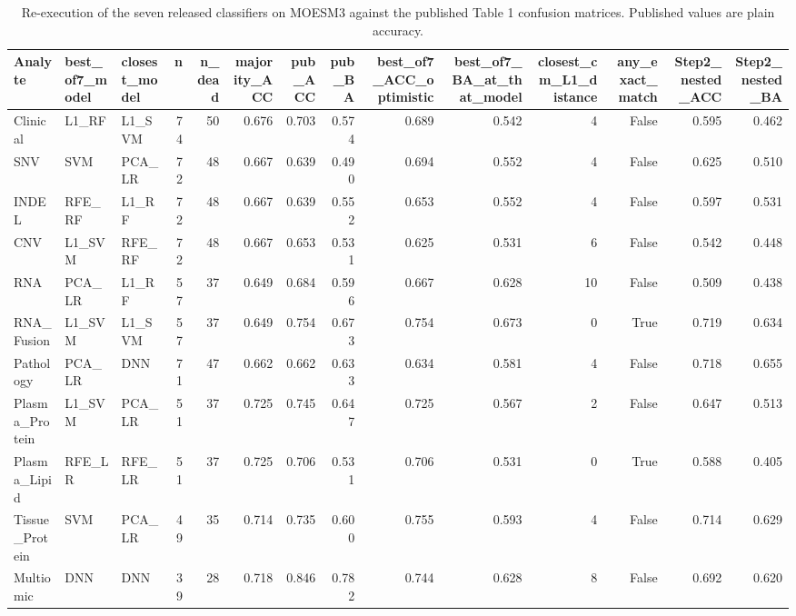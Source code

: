 \begin{table}[t]
\centering
\caption{Re-execution of the seven released classifiers on MOESM3 against the published Table 1 confusion matrices. Published values are plain accuracy.}
\begin{tabular}{lllrrrrrrrrrrr}
\hline
Analyte & best\_of7\_model & closest\_model & n & n\_dead & majority\_ACC & pub\_ACC & pub\_BA & best\_of7\_ACC\_optimistic & best\_of7\_BA\_at\_that\_model & closest\_cm\_L1\_distance & any\_exact\_match & Step2\_nested\_ACC & Step2\_nested\_BA \\
\hline
Clinical & L1\_RF & L1\_SVM & 74 & 50 & 0.676 & 0.703 & 0.574 & 0.689 & 0.542 & 4 & False & 0.595 & 0.462 \\
SNV & SVM & PCA\_LR & 72 & 48 & 0.667 & 0.639 & 0.490 & 0.694 & 0.552 & 4 & False & 0.625 & 0.510 \\
INDEL & RFE\_RF & L1\_RF & 72 & 48 & 0.667 & 0.639 & 0.552 & 0.653 & 0.552 & 4 & False & 0.597 & 0.531 \\
CNV & L1\_SVM & RFE\_RF & 72 & 48 & 0.667 & 0.653 & 0.531 & 0.625 & 0.531 & 6 & False & 0.542 & 0.448 \\
RNA & PCA\_LR & L1\_RF & 57 & 37 & 0.649 & 0.684 & 0.596 & 0.667 & 0.628 & 10 & False & 0.509 & 0.438 \\
RNA\_Fusion & L1\_SVM & L1\_SVM & 57 & 37 & 0.649 & 0.754 & 0.673 & 0.754 & 0.673 & 0 & True & 0.719 & 0.634 \\
Pathology & PCA\_LR & DNN & 71 & 47 & 0.662 & 0.662 & 0.633 & 0.634 & 0.581 & 4 & False & 0.718 & 0.655 \\
Plasma\_Protein & L1\_SVM & PCA\_LR & 51 & 37 & 0.725 & 0.745 & 0.647 & 0.725 & 0.567 & 2 & False & 0.647 & 0.513 \\
Plasma\_Lipid & RFE\_LR & RFE\_LR & 51 & 37 & 0.725 & 0.706 & 0.531 & 0.706 & 0.531 & 0 & True & 0.588 & 0.405 \\
Tissue\_Protein & SVM & PCA\_LR & 49 & 35 & 0.714 & 0.735 & 0.600 & 0.755 & 0.593 & 4 & False & 0.714 & 0.629 \\
Multiomic & DNN & DNN & 39 & 28 & 0.718 & 0.846 & 0.782 & 0.744 & 0.628 & 8 & False & 0.692 & 0.620 \\
\hline
\end{tabular}
\end{table}
